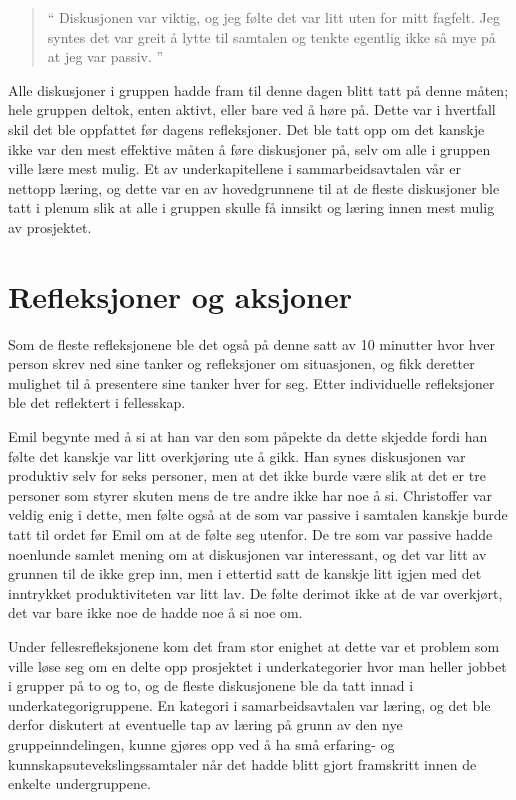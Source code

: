 \begin{quote}``
Diskusjonen var viktig, og jeg følte det var litt uten for mitt fagfelt. Jeg syntes det var greit å lytte til samtalen og tenkte egentlig ikke så mye på at jeg var passiv.
''\end{quote} 

Alle diskusjoner i gruppen hadde fram til denne dagen blitt tatt på denne måten; hele gruppen deltok, enten aktivt, eller bare ved å høre på. Dette var i hvertfall skil det ble oppfattet før dagens refleksjoner. Det ble tatt opp om det kanskje ikke var den mest effektive måten å føre diskusjoner på, selv om alle i gruppen ville lære mest mulig. Et av underkapitellene i sammarbeidsavtalen vår er nettopp læring, og dette var en av hovedgrunnene til at de fleste diskusjoner ble tatt i plenum slik at alle i gruppen skulle få innsikt og læring innen mest mulig av prosjektet.

\section{Refleksjoner og aksjoner}
Som de fleste refleksjonene ble det også på denne satt av 10 minutter hvor hver person skrev ned sine tanker og refleksjoner om situasjonen, og fikk deretter mulighet til å presentere sine tanker hver for seg. Etter individuelle refleksjoner ble det reflektert i fellesskap.

Emil begynte med å si at han var den som påpekte da dette skjedde fordi han følte det kanskje var litt overkjøring ute å gikk. Han synes diskusjonen var produktiv selv for seks personer, men at det ikke burde være slik at det er tre personer som styrer skuten mens de tre andre ikke har noe å si. Christoffer var veldig enig i dette, men følte også at de som var passive i samtalen kanskje burde tatt til ordet før Emil om at de følte seg utenfor. De tre som var passive hadde noenlunde samlet mening om at diskusjonen var interessant, og det var litt av grunnen til de ikke grep inn, men i ettertid satt de kanskje litt igjen med det inntrykket produktiviteten var litt lav. De følte derimot ikke at de var overkjørt, det var bare ikke noe de hadde noe å si noe om.

Under fellesrefleksjonene kom det fram stor enighet at dette var et problem som ville løse seg om en delte opp prosjektet i underkategorier hvor man heller jobbet i grupper på to og to, og de fleste diskusjonene ble da tatt innad i underkategorigruppene. En kategori i samarbeidsavtalen var læring, og det ble derfor diskutert at eventuelle tap av læring på grunn av den nye gruppeinndelingen, kunne gjøres opp ved å ha små erfaring- og kunnskapsutevekslingssamtaler når det hadde blitt gjort framskritt innen de enkelte undergruppene.

